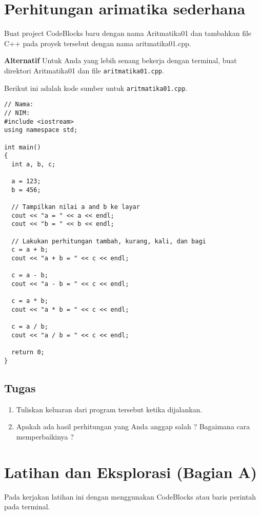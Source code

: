 \documentclass[a4paper,11pt]{extarticle}
\begin{document}
\section{Perhitungan arimatika sederhana}

Buat project CodeBlocks baru dengan nama \textsf{Aritmatika01} dan tambahkan file
C++ pada proyek tersebut dengan nama \textsf{aritmatika01.cpp}.

\textbf{Alternatif} Untuk Anda yang lebih senang bekerja dengan
terminal, buat direktori \textsf{Aritmatika01} dan file \texttt{aritmatika01.cpp}.

Berikut ini adalah kode sumber untuk \texttt{aritmatika01.cpp}.

\begin{verbatim}
// Nama:
// NIM:
#include <iostream>
using namespace std;

int main()
{
  int a, b, c;

  a = 123;
  b = 456;

  // Tampilkan nilai a and b ke layar
  cout << "a = " << a << endl;
  cout << "b = " << b << endl;

  // Lakukan perhitungan tambah, kurang, kali, dan bagi
  c = a + b;
  cout << "a + b = " << c << endl;
  
  c = a - b;
  cout << "a - b = " << c << endl;

  c = a * b;
  cout << "a * b = " << c << endl;

  c = a / b;
  cout << "a / b = " << c << endl;

  return 0;
}
\end{verbatim}

\subsection{Tugas}
\begin{enumerate}
\item Tuliskan keluaran dari program tersebut ketika dijalankan.
%
\item Apakah ada hasil perhitungan yang Anda anggap salah ?
      Bagaimana cara memperbaikinya ?
\end{enumerate}


\section{Latihan dan Eksplorasi (Bagian A)}

Pada kerjakan latihan ini dengan menggunakan CodeBlocks atau baris perintah
pada terminal.
\end{document}
